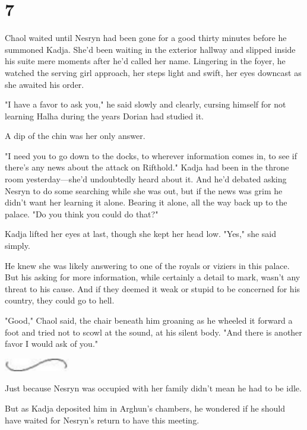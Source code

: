 
\chapter{7}

Chaol waited until Nesryn had been gone for a good thirty minutes before he summoned Kadja. She'd been waiting in the exterior hallway and slipped inside his suite mere moments after he'd called her name. Lingering in the foyer, he watched the serving girl approach, her steps light and swift, her eyes downcast as she awaited his order.

"I have a favor to ask you," he said slowly and clearly, cursing himself for not learning Halha during the years Dorian had studied it.

A dip of the chin was her only answer.

"I need you to go down to the docks, to wherever information comes in, to see if there's any news about the attack on Rifthold." Kadja had been in the throne room yesterday---she'd undoubtedly heard about it. And he'd debated asking Nesryn to do some searching while she was out, but if the news was grim  he didn't want her learning it alone. Bearing it alone, all the way back up to the palace. "Do you think you could do that?"

Kadja lifted her eyes at last, though she kept her head low. "Yes," she said simply.

He knew she was likely answering to one of the royals or viziers in this palace. But his asking for more information, while certainly a detail to mark, wasn't any threat to his cause. And if they deemed it weak or stupid to be concerned for his country, they could go to hell.

"Good," Chaol said, the chair beneath him groaning as he wheeled it forward a foot and tried not to scowl at the sound, at his silent body. "And there is another favor I would ask of you."

\begin{center}
\includegraphics[width=1.12in,height=0.24in]{images/seperator}
\end{center}

Just because Nesryn was occupied with her family didn't mean he had to be idle.

But as Kadja deposited him in Arghun's chambers, he wondered if he should have waited for Nesryn's return to have this meeting.


